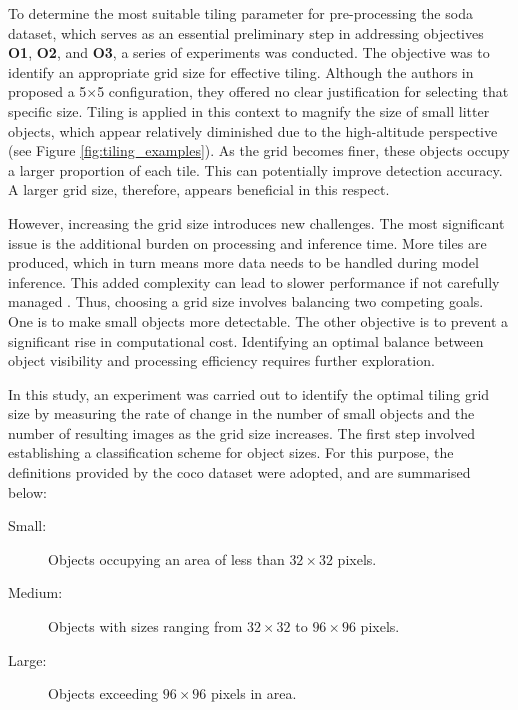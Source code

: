 To determine the most suitable tiling parameter for pre-processing the \gls{soda} dataset, which serves as an essential preliminary step in addressing objectives \textbf{O1}, \textbf{O2}, and \textbf{O3}, a series of experiments was conducted. The objective was to identify an appropriate grid size for effective tiling. Although the authors in \cite{detect_litter} proposed a 5$\times$5 configuration, they offered no clear justification for selecting that specific size.
Tiling is applied in this context to magnify the size of small litter objects, which appear relatively diminished due to the high-altitude perspective (see Figure \ref{fig:tiling_examples}). As the grid becomes finer, these objects occupy a larger proportion of each tile. This can potentially improve detection accuracy. A larger grid size, therefore, appears beneficial in this respect.

However, increasing the grid size introduces new challenges. The most significant issue is the additional burden on processing and inference time. More tiles are produced, which in turn means more data needs to be handled during model inference. This added complexity can lead to slower performance if not carefully managed \cite{tiling}.
Thus, choosing a grid size involves balancing two competing goals. One is to make small objects more detectable. The other objective is to prevent a significant rise in computational cost. Identifying an optimal balance between object visibility and processing efficiency requires further exploration.

In this study, an experiment was carried out to identify the optimal tiling grid size by measuring the rate of change in the number of small objects and the number of resulting images as the grid size increases. The first step involved establishing a classification scheme for object sizes. For this purpose, the definitions provided by the \gls{coco} dataset \cite{coco} were adopted, and are summarised below:

\begin{adjustwidth}{4em}{0pt} %
\begin{description}
    \item[Small:] Objects occupying an area of less than $32 \times 32$ pixels.
    \item[Medium:] Objects with sizes ranging from $32 \times 32$ to $96 \times 96$ pixels.
    \item[Large:] Objects exceeding $96 \times 96$ pixels in area.
\end{description}
\end{adjustwidth}

